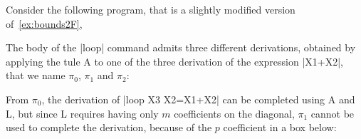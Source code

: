 \begin{example}\label{ex:partial}
Consider the following program, that is a slightly modified version of~\autoref{ex:bounds2F},



The body of the \pr|loop| command admits three different derivations,
obtained by applying the tule A to one of the three derivation of the expression
\pr|X1+X2|, that we name \(\pi_0\), \(\pi_1\) and \(\pi_2\):

\begin{center}
\hfill
{}
\hfill
{}
\end{center}

From \(\pi_0\), the derivation of  \pr|loop X3 {X2=X1+X2}| can be
completed using A and L, but since L requires having only \(m\) coefficients
on the diagonal, \(\pi_1\) cannot be used to complete the derivation,
because of the \(p\) coefficient in a box below:


\end{example}
